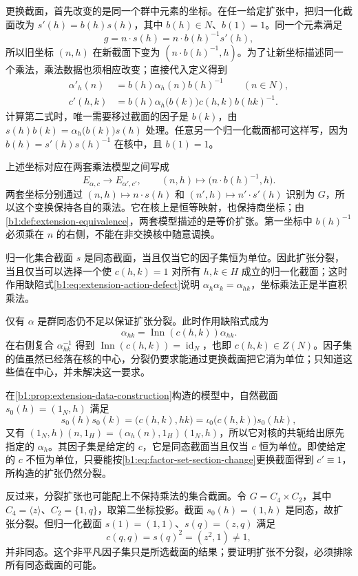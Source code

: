 更换截面，首先改变的是同一个群中元素的坐标。在任一给定扩张中，把归一化截面改为 \(s'(h)=b(h)s(h)\)，其中 \(b(h)\in N\)、\(b(1)=1\)。同一个元素满足
\[
	g=n\cdot s(h)=n\cdot b(h)^{-1}s'(h),
\]
所以旧坐标 \((n,h)\) 在新截面下变为 \((n\cdot b(h)^{-1},h)\)。为了让新坐标描述同一个乘法，乘法数据也须相应改变；直接代入定义得到
\begin{equation}\label{b1:eq:factor-set-section-change}
	\begin{aligned}
		\alpha'_h(n)&=b(h)\alpha_h(n)b(h)^{-1}\qquad(n\in N),\\
		c'(h,k)&=b(h)\alpha_h\bigl(b(k)\bigr)c(h,k)b(hk)^{-1}.
	\end{aligned}
\end{equation}
计算第二式时，唯一需要移过截面的因子是 \(b(k)\)，由 \(s(h)b(k)=\alpha_h\bigl(b(k)\bigr)s(h)\) 处理。任意另一个归一化截面都可这样写，因为 \(b(h)=s'(h)s(h)^{-1}\) 在核中，且 \(b(1)=1\)。

\ProseParagraphBreak
上述坐标对应在两套乘法模型之间写成
\begin{equation}\label{b1:eq:extension-coordinate-change}
	E_{\alpha,c}\longrightarrow E_{\alpha',c'},\qquad (n,h)\longmapsto\bigl(n\cdot b(h)^{-1},h\bigr).
\end{equation}
两套坐标分别通过 \((n,h)\mapsto n\cdot s(h)\) 和 \((n',h)\mapsto n'\cdot s'(h)\) 识别为 \(G\)，所以这个变换保持各自的乘法。它在核上是恒等映射，也保持商坐标；由\cref{b1:def:extension-equivalence}，两套模型描述的是等价扩张。第一坐标中 \(b(h)^{-1}\) 必须乘在 \(n\) 的右侧，不能在非交换核中随意调换。

\ProseParagraphBreak
归一化集合截面 \(s\) 是同态截面，当且仅当它的因子集恒为单位。因此扩张分裂，当且仅当可以选择一个使 \(c(h,k)=1\) 对所有 \(h,k\in H\) 成立的归一化截面；这时作用缺陷式\eqref{b1:eq:extension-action-defect}说明 \(\alpha_h\alpha_k=\alpha_{hk}\)，坐标乘法正是半直积乘法。

\ProseParagraphBreak
仅有 \(\alpha\) 是群同态仍不足以保证扩张分裂。此时作用缺陷式成为
\[
	\alpha_{hk}=\operatorname{Inn}(c(h,k))\alpha_{hk}.
\]
在右侧复合 \(\alpha_{hk}^{-1}\) 得到 \(\operatorname{Inn}(c(h,k))=\operatorname{id}_N\)，也即 \(c(h,k)\in Z(N)\)。因子集的值虽然已经落在核的中心，分裂仍要求能通过更换截面把它消为单位；只知道这些值在中心，并未解决这一要求。

\ProseParagraphBreak
在\cref{b1:prop:extension-data-construction}构造的模型中，自然截面 \(s_0(h)=(1_N,h)\) 满足
\[
	s_0(h)s_0(k)=\bigl(c(h,k),hk\bigr) =\iota_0\bigl(c(h,k)\bigr)s_0(hk),
\]
又有 \((1_N,h)(n,1_H)=(\alpha_h(n),1_H)(1_N,h)\)，所以它对核的共轭给出原先指定的 \(\alpha_h\)。其因子集是给定的 \(c\)，它是同态截面当且仅当 \(c\) 恒为单位。即使给定的 \(c\) 不恒为单位，只要能按\eqref{b1:eq:factor-set-section-change}更换截面得到 \(c'\equiv1\)，所构造的扩张仍然分裂。

\ProseParagraphBreak
反过来，分裂扩张也可能配上不保持乘法的集合截面。令 \(G=C_4\times C_2\)，其中 \(C_4=\langle z\rangle\)、\(C_2=\{1,q\}\)，取第二坐标投影。截面 \(s_0(h)=(1,h)\) 是同态，故扩张分裂。但归一化截面 \(s(1)=(1,1)\)、\(s(q)=(z,q)\) 满足
\[
	c(q,q)=s(q)^2=(z^2,1)\neq1,
\]
并非同态。这个非平凡因子集只是所选截面的结果；要证明扩张不分裂，必须排除所有同态截面的可能。
